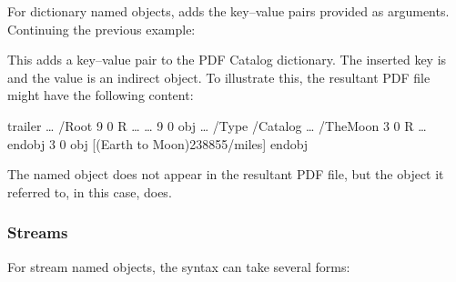 \documentclass[letterpaper,12pt,english,openany,oneside]{sphinxmanual}
\begin{document}
For dictionary named objects,  adds the key–value pairs provided as arguments. Continuing the previous example:

\begin{sphinxVerbatim}[commandchars=\\\{\}]
\PYG{p}{[}       
\end{sphinxVerbatim}

This adds a key–value pair to the PDF Catalog dictionary. The inserted key is  and the value is an indirect object. To illustrate this, the resultant PDF file might have the following content:

\begin{sphinxVerbatim}[commandchars=\\\{\}]
trailer
 \PYGZlt{}\PYGZlt{} … /Root 9 0 R … \PYGZgt{}\PYGZgt{}
 …
 9 0 obj \PYGZlt{}\PYGZlt{} … /Type /Catalog … /TheMoon 3 0 R … \PYGZgt{}\PYGZgt{}
 endobj
 3 0 obj [(Earth to Moon)238855/miles]
 endobj
\end{sphinxVerbatim}

The named object  does not appear in the resultant PDF file, but the object it referred to,  in this case, does.


\subsubsection{Streams}
\label{\detokenize{pdfmark_Syntax:streams}}
For stream named objects, the syntax can take several forms:

\begin{sphinxVerbatim}[commandchars=\\\{\}]
\PYG{p}{[}   
  

   \PYG{p}{[}   
  
 \PYG{p}{[}   
 






   
\end{sphinxVerbatim}
\end{document}
